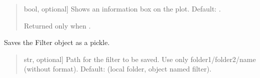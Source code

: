 \documentclass[letterpaper,10pt,english]{sphinxmanual}
\begin{document}
\begin{fulllineitems}
\begin{fulllineitems}
\begin{quote}
\begin{description}
\begin{description}
\sphinxlineitem{\sphinxstylestrong{show\_info\_box}}{[}bool, optional{]}
\sphinxAtStartPar
Shows an information box on the plot. Default: .

\end{description}

\begin{description}
\sphinxAtStartPar
Returned only when .

\end{description}

\end{description}\end{quote}

\end{fulllineitems}


\begin{fulllineitems}
\label{\detokenize{classes:dsptoolbox.classes.filter_class.Filter.sampling_rate_hz}}
\pysigstartsignatures
{}
\pysigstopsignatures
\end{fulllineitems}


\begin{fulllineitems}
\label{\detokenize{classes:dsptoolbox.classes.filter_class.Filter.save_filter}}
\pysigstartsignatures
{}
\pysigstopsignatures
\sphinxAtStartPar
Saves the Filter object as a pickle.
\begin{quote}\begin{description}
\begin{description}
\sphinxlineitem{\sphinxstylestrong{path}}{[}str, optional{]}
\sphinxAtStartPar
Path for the filter to be saved. Use only folder1/folder2/name
(without format). Default: 
(local folder, object named filter).


\end{description}
\end{description}
\end{quote}
\end{fulllineitems}
\end{fulllineitems}
\end{document}

